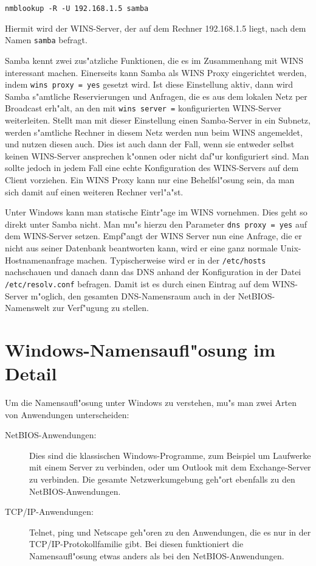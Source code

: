 \documentclass{scrartcl}\usepackage{pslatex}\typearea{12}
\newcommand{\prog}{\texttt}
\newcommand{\param}{\texttt}
\newcommand{\dateistyle}{\texttt}
\newcommand{\nbname}{\texttt}
\begin{document}
\begin{verbatim}
nmblookup -R -U 192.168.1.5 samba
\end{verbatim}

Hiermit wird der WINS-Server, der auf dem Rechner 192.168.1.5 liegt,
nach dem Namen \nbname{samba} befragt.

Samba kennt zwei zus"atzliche Funktionen, die es im Zusammenhang mit
WINS interessant machen. Einerseits kann Samba als WINS Proxy
eingerichtet werden, indem \param{wins proxy = yes} gesetzt wird. Ist
diese Einstellung aktiv, dann wird Samba s"amtliche Reservierungen und
Anfragen, die es aus dem lokalen Netz per Broadcast erh"alt, an den
mit \prog{wins server =} konfigurierten WINS-Server weiterleiten.
Stellt man mit dieser Einstellung einen Samba-Server in ein Subnetz,
werden s"amtliche Rechner in diesem Netz werden nun beim WINS
angemeldet, und nutzen diesen auch. Dies ist auch dann der Fall, wenn
sie entweder selbst keinen WINS-Server ansprechen k"onnen oder nicht
daf"ur konfiguriert sind. Man sollte jedoch in jedem Fall eine echte
Konfiguration des WINS-Servers auf dem Client vorziehen. Ein WINS
Proxy kann nur eine Behelfsl"osung sein, da man sich damit auf einen
weiteren Rechner verl"a"st.

Unter Windows kann man statische Eintr"age im WINS vornehmen. Dies
geht so direkt unter Samba nicht. Man mu"s hierzu den Parameter
\param{dns proxy = yes} auf dem WINS-Server setzen. Empf"angt der WINS
Server nun eine Anfrage, die er nicht aus seiner Datenbank beantworten
kann, wird er eine ganz normale Unix-Hostnamenanfrage machen.
Typischerweise wird er in der \dateistyle{/etc/hosts} nachschauen und
danach dann das DNS anhand der Konfiguration in der Datei
\dateistyle{/etc/resolv.conf} befragen. Damit ist es durch einen Eintrag
auf dem WINS-Server m"oglich, den gesamten DNS-Namensraum auch in der
NetBIOS-Namenswelt zur Verf"ugung zu stellen.

\section{Windows-Namensaufl"osung im Detail}

Um die Namensaufl"osung unter Windows zu verstehen, mu"s man zwei
Arten von Anwendungen unterscheiden:

\begin{description}
\item[NetBIOS-Anwendungen:] Dies sind die klassischen
  Windows-Programme, zum Beispiel um Laufwerke mit einem Server zu
  verbinden, oder um Outlook mit dem Exchange-Server zu verbinden. Die
  gesamte Netzwerkumgebung geh"ort ebenfalls zu den
  NetBIOS-Anwen\-dun\-gen.
\item[TCP/IP-Anwendungen:] Telnet, ping und Netscape geh"oren zu den
  Anwendungen, die es nur in der TCP/IP-Protokollfamilie gibt. Bei
  diesen funktioniert die Namensaufl"osung etwas anders als bei den
  NetBIOS-Anwendungen.
\end{description}
\end{document}
